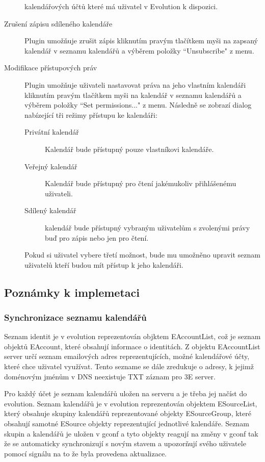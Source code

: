 \documentclass[a4paper,10pt]{article}
\begin{document}
\begin{multicols*}{2}
\begin{description}
kalendářových účtů které má uživatel v Evolution k dispozici.
\item[Zrušení zápisu sdíleného kalendáře] Plugin umožňuje zrušit zápis kliknutím
pravým tlačítkem myši na zapsaný kalendář v seznamu kalendářů a výběrem položky
``Unsubscribe" z menu.
\item[Modifikace přístupových práv] Plugin umožňuje uživateli nastavovat práva
na jeho vlastním kalendáři kliknutím pravým tlačítkem myši na kalendář v seznamu
kalendářů a výběrem položky ``Set permissions..." z menu. Následně se zobrazí
dialog nabízející tři režimy přístupu ke kalendáři:
  \begin{description}
  \item[Privátní kalendář] Kalendář bude přístupný pouze vlastníkovi kalendáře.
  \item[Veřejný kalendář] Kalendář bude přístupný pro čtení jakémukoliv
  přihlášenému uživateli.
  \item[Sdílený kalendář] kalendář bude přístupný vybraným uživatelům s
  zvolenými právy buď pro zápis nebo jen pro čtení.
  \end{description}
Pokud si uživatel vybere třetí možnost, bude mu umožněno upravit seznam
uživatelů kteří budou mít přístup k jeho kalendáři.
\end{description}

\subsection{Poznámky k implemetaci}

\subsubsection{Synchronizace seznamu kalendářů}

Seznam identit je v evolution reprezentován objktem EAccountList, což je seznam
objektů EAccount, které obsahují informace o identitách. Z objektu EAccountList
server určí seznam emailových adres reprezentujících, možné kalendářové účty,
které chce uživatel využívat. Tento sezname se dále zredukuje o adresy, k jejimž
doménovým jménům v DNS neexistuje TXT záznam pro 3E server.

Pro každý účet je seznam kalendářů uložen na serveru a je třeba jej načíst do 
evolution. Seznam kalendářů je v evolution reprezentován objektem ESourceList,
který obsahuje skupiny kalendářů reprezentované objekty ESourceGroup, které
obsahují samotné ESource objekty reprezentující jednotlivé kalendáře.
Seznam skupin a kalendářů je uložen v gconf a tyto objekty reagují na změny v
gconf tak že se automaticky synchronizují s novým stavem a upozorňují svého
uživatele pomocí signálu na to že byla provedena aktualizace.


\end{multicols*}
\end{document}
